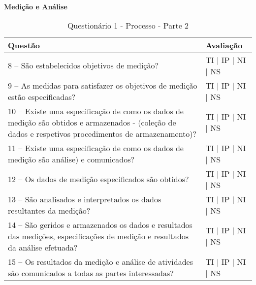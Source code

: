 \documentclass[openany,10pt,a4paper]{article}
\begin{document}
\begin{appendix}
\begin{table}[h]
\textbf{Medição e Análise}
	\centering
	\caption{Questionário 1 - Processo - Parte 2}
	\begin{tabular}{p{3.5in}p{2in}}		
		\toprule
	
		\textbf{Questão}  & \textbf{Avaliação}\\ 
		\midrule
		8 – São estabelecidos objetivos de medição?
 & TI | IP | NI | NS \\
        \midrule
		9 – As medidas para satisfazer os objetivos de medição estão especificadas?
 & TI | IP | NI | NS \\
		\midrule
		10 – Existe uma especificação de como os dados de medição são obtidos e armazenados - 
(coleção de dados e respetivos procedimentos de armazenamento)?
 & TI | IP | NI | NS \\
		\midrule
        11 – Existe uma especificação de como os dados de medição são análise) e comunicados?
 & TI | IP | NI | NS \\
		\midrule
		12 – Os dados de medição especificados são obtidos?
  & TI | IP | NI | NS \\
		\midrule
		13 – São analisados e interpretados os dados resultantes da medição?
 & TI | IP | NI | NS \\
		\midrule
		14 – São geridos e armazenados os dados e resultados das medições, especificações de medição 
e resultados da análise efetuada?
 & TI | IP | NI | NS \\
        \midrule
        15 – Os resultados da medição e análise de atividades são comunicados a todas as partes
interessadas?
 & TI | IP | NI | NS \\
		\bottomrule
	\end{tabular} 
	\label{tab:tabela1}
\end{table}


\end{appendix}
\end{document}
